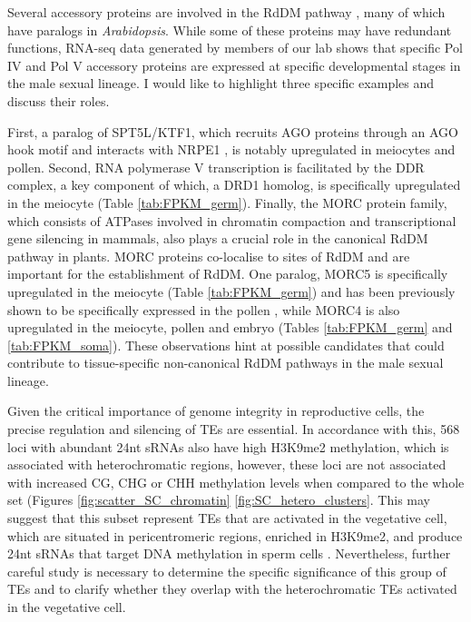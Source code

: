 Several accessory proteins are involved in the RdDM pathway \cite{RN33}, many of which have paralogs in \textit{Arabidopsis}. While some of these proteins may have redundant functions, RNA-seq data generated by members of our lab shows that specific Pol IV and Pol V accessory proteins are expressed at specific developmental stages in the male sexual lineage. I would like to highlight three specific examples and discuss their roles. 

 First, a paralog of SPT5L/KTF1, which recruits AGO proteins through an AGO hook motif \cite{RN121,RN273}  and interacts with NRPE1 \cite{RN271,RN272}, is notably upregulated in meiocytes and pollen. Second, RNA polymerase V transcription is facilitated by the DDR complex, a key component of which, a DRD1 homolog, is specifically upregulated in the meiocyte (Table \ref{tab:FPKM_germ}). Finally, the MORC protein family, which consists of ATPases involved in chromatin compaction and transcriptional gene silencing in mammals, also plays a crucial role in the canonical RdDM pathway in plants. MORC proteins co-localise to sites of RdDM and are important for the establishment of RdDM. One paralog, MORC5 is specifically upregulated in the meiocyte (Table \ref{tab:FPKM_germ}) and has been previously shown to be specifically expressed in the pollen \cite{RN274}, while MORC4 is also upregulated in the meiocyte, pollen and embryo (Tables \ref{tab:FPKM_germ} and \ref{tab:FPKM_soma}). These observations hint at possible candidates that could contribute to tissue-specific non-canonical RdDM pathways in the male sexual lineage.

Given the critical importance of genome integrity in reproductive cells, the precise regulation and silencing of TEs are essential. In accordance with this, 568 loci with abundant 24nt sRNAs also have high H3K9me2 methylation, which is associated with heterochromatic regions, however, these loci are not associated with increased CG, CHG or CHH methylation levels when compared to the whole set (Figures \ref{fig:scatter_SC_chromatin} \ref{fig:SC_hetero_clusters}. This may suggest that this subset represent TEs that are activated in the vegetative cell, which are situated in pericentromeric regions, enriched in H3K9me2, and produce 24nt sRNAs that target DNA methylation in sperm cells \cite{RN278}. Nevertheless, further careful study is necessary to determine the specific significance of this group of TEs and to clarify whether they overlap with the heterochromatic TEs activated in the vegetative cell.


